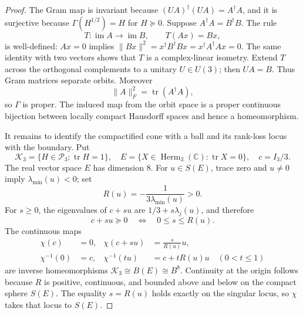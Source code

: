 \documentclass[11pt,letterpaper]{article}
\numberwithin{equation}{section}
\theoremstyle{definition}
\theoremstyle{remark}
\newcommand{\C}{\mathbb C}
\begin{document}
\begin{proof}
The Gram map is invariant because
\((UA)^\dagger(UA)=A^\dagger A\), and it is surjective because
\(\Gamma(H^{1/2})=H\) for \(H\succeq0\).  Suppose
\(A^\dagger A=B^\dagger B\).  The rule
\[
 T:\operatorname{im}A\longrightarrow\operatorname{im}B,
 \qquad T(Ax)=Bx,
\]
is well-defined: \(Ax=0\) implies
\(\|Bx\|^2=x^\dagger B^\dagger Bx=x^\dagger A^\dagger Ax=0\).
The same identity with two vectors shows that \(T\) is a complex-linear
isometry.  Extend \(T\) across the orthogonal complements to a unitary
\(U\in U(3)\); then \(UA=B\).  Thus Gram matrices separate orbits.
Moreover
\begin{equation}
 \|A\|_F^2=\operatorname{tr}(A^\dagger A),
 \label{eq:Gram-properness}
\end{equation}
so \(\Gamma\) is proper.  The induced map from the orbit space is a proper
continuous bijection between locally compact Hausdorff spaces and hence a
homeomorphism.

It remains to identify the compactified cone with a ball and its rank-loss
locus with the boundary.  Put
\[
 \mathcal K_3=\{H\in\mathcal P_3:\operatorname{tr}H=1\},
 \quad
 E=\{X\in\operatorname{Herm}_3(\C):\operatorname{tr}X=0\},
 \quad c=I_3/3.
\]
The real vector space \(E\) has dimension \(8\).  For
\(u\in S(E)\), trace zero and \(u\ne0\) imply
\(\lambda_{\min}(u)<0\); set
\begin{equation}
 R(u)=-\frac1{3\lambda_{\min}(u)}>0.
 \label{eq:Gram-radial-function}
\end{equation}
For \(s\geq0\), the eigenvalues of \(c+su\) are
\(1/3+s\lambda_j(u)\), and therefore
\[
 c+su\succeq0
 \quad\Longleftrightarrow\quad0\leq s\leq R(u).
\]
The continuous maps
\begin{align}
 \chi(c)&=0,
 &\chi(c+su)&=\frac{s}{R(u)}u,
 \label{eq:Gram-K3-ball-map}\\
 \chi^{-1}(0)&=c,
 &\chi^{-1}(tu)&=c+tR(u)u\quad(0<t\leq1)
 \label{eq:Gram-K3-ball-inverse}
\end{align}
are inverse homeomorphisms
\(\mathcal K_3\cong B(E)\cong B^8\).  Continuity at the origin follows
because \(R\) is positive, continuous, and bounded above and below on the
compact sphere \(S(E)\).  The equality \(s=R(u)\) holds exactly on the
singular locus, so \(\chi\) takes that locus to \(S(E)\).


\end{proof}
\end{document}
